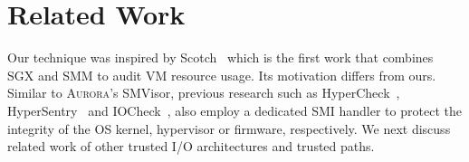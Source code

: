 %



\section{Related Work}
Our technique was inspired by Scotch~\cite{DBLP:conf/raid/LeachZW17} which is the first work that combines SGX and SMM to audit VM resource usage. Its motivation differs from ours.
Similar to \textsc{Aurora}'s SMVisor, previous research such as HyperCheck~\cite{DBLP:conf/raid/WangSG10}, HyperSentry~\cite{DBLP:conf/ccs/AzabNWJZS10} and IOCheck~\cite{DBLP:conf/esorics/ZhangWLS14}, also employ a dedicated SMI handler to protect the integrity of the OS kernel, hypervisor or firmware, respectively.
We next discuss related work of other trusted I/O architectures and trusted paths.

